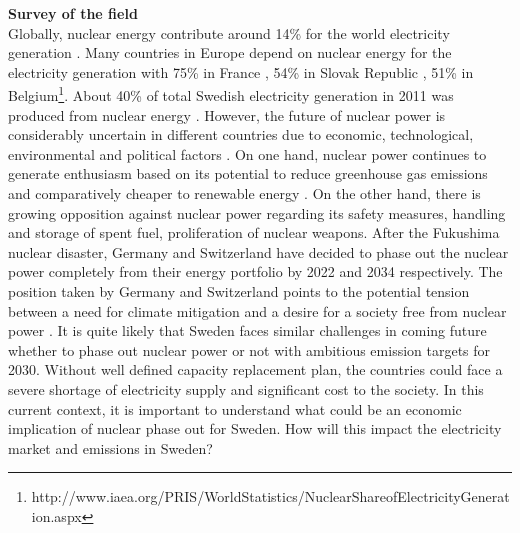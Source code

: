\textbf{Survey of the field}\\
Globally, nuclear energy contribute around 14\% for the world electricity generation \citep{OECD2012}. Many countries in Europe depend on nuclear energy for the electricity generation with 75\% in France , 54\% in Slovak Republic , 51\% in Belgium\footnote{http://www.iaea.org/PRIS/WorldStatistics/NuclearShareofElectricityGeneration.aspx}. About 40\% of total Swedish electricity generation in 2011 was produced from nuclear energy \citep{SEA2012}. However, the future of nuclear power is considerably uncertain in different countries due to economic, technological, environmental and political factors \citep{Joskow2012}. On one hand, nuclear power continues to generate enthusiasm based on its potential to reduce greenhouse gas emissions and comparatively cheaper to renewable energy \citep{Davis2012, Renssen2013}. On the other hand, there is growing opposition against nuclear power regarding its safety measures, handling and storage of spent fuel, proliferation of nuclear weapons. After the Fukushima nuclear disaster, Germany and Switzerland have decided to phase out the nuclear power completely from their energy portfolio by  2022 and 2034 respectively. The position taken by Germany and Switzerland points to the potential tension between a need for climate mitigation and a desire for a society free from nuclear power \citep{Glomsrod2013}. It is quite likely that Sweden faces similar challenges in coming future whether to phase out nuclear power or not with ambitious emission targets for 2030. Without well defined capacity replacement plan, the countries could face a severe shortage of electricity supply and significant cost to the society. In this current context, it is important to understand what could be an economic implication of nuclear phase out for Sweden. How will this impact the electricity market and emissions in Sweden?

